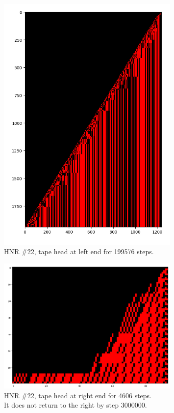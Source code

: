 \documentclass[12pt]{article}
\begin{document}
\begin{figure}[H]
\centering
\includegraphics[width=0.8\textwidth]{22.png}
\caption{HNR \#22, tape head at left end for 199576 steps.}
\end{figure}

\begin{figure}[H]
\centering
\includegraphics[width=0.8\textwidth]{22r.png}
\caption{HNR \#22, tape head at right end for 4606 steps.\\
It does not return to the right by step 3000000.}
\end{figure}
\end{document}
